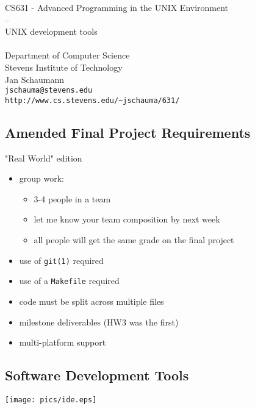 \documentclass[xga]{xdvislides}
\begin{document}
\setfontphv

\lhead{\slidetitle}
\cfoot{\relax}
\rfoot{\Gray{\today}}

\vspace*{\fill}
\begin{center}
	\Hugesize
		CS631 - Advanced Programming in the UNIX Environment\\
		-- \\
		UNIX development tools \\
	\hspace*{5mm}\blueline\\ [1em]
	\Normalsize
		Department of Computer Science\\
		Stevens Institute of Technology\\
		Jan Schaumann\\
		\verb+jschauma@stevens.edu+\\
		\verb+http://www.cs.stevens.edu/~jschauma/631/+
\end{center}
\vspace*{\fill}

\subsection{Amended Final Project Requirements}
"Real World" edition
\begin{itemize}
	\item group work:
		\begin{itemize}
			\item 3-4 people in a team
			\item let me know your team composition by next week
			\item all people will get the same grade on the final project
		\end{itemize}
	\item use of {\tt git(1)} required
	\item use of a {\tt Makefile} required
	\item code must be split across multiple files
	\item milestone deliverables (HW3 was the first)
	\item multi-platform support
\end{itemize}

\subsection{Software Development Tools}
\begin{center}
	\texttt{[image: pics/ide.eps]}
\end{center}
\end{document}
